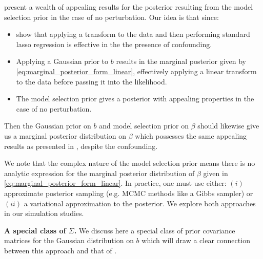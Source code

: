 \documentclass[11pt]{article}
\begin{document}
\cite{CS-HV2015} present a wealth of appealing results for the posterior resulting from the model selection prior in the case of no perturbation. Our idea is that since:
\begin{itemize}
	\item \cite{CBM2020} show that applying a transform to the data and then performing standard lasso regression is effective in the the presence of confounding. 
	\item  Applying a Gaussian prior to $b$ results in the marginal posterior given by \eqref{eq:marginal_posterior_form_linear}, effectively applying a linear transform to the data before passing it into the likelihood. 
	\item The model selection prior gives a posterior with appealing properties in the case of no perturbation.
\end{itemize}
 Then the Gaussian prior on $b$ and model selection prior on $\beta$ should likewise give us a marginal posterior distribution on $\beta$ which possesses the same appealing results as presented in \cite{CS-HV2015}, despite the confounding.

We note that the complex nature of the model selection prior means there is no analytic expression for the marginal posterior distribution of $\beta$ given in \eqref{eq:marginal_posterior_form_linear}. In practice, one must use either: $(i)$ approximate posterior sampling (e.g. MCMC methods like a Gibbs sampler) or $(ii)$ a variational approximation to the posterior. We explore both approaches in our simulation studies.

{\bf A special class of $\Sigma$.} We discuss here a special class of prior covariance matrices for the Gaussian distribution on $b$ which will draw a clear connection between this approach and that of \cite{CBM2020}.
\end{document}
